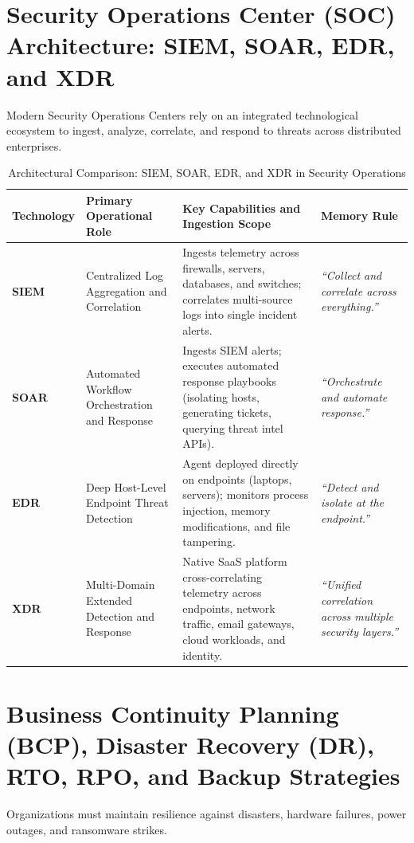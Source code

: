 \newpage
\section{Security Operations Center (SOC) Architecture: SIEM, SOAR, EDR, and XDR}

Modern Security Operations Centers rely on an integrated technological ecosystem to ingest, analyze, correlate, and respond to threats across distributed enterprises.

\begin{table}[htbp]
\centering
\caption{Architectural Comparison: SIEM, SOAR, EDR, and XDR in Security Operations}
\label{tab:siem_soar_edr_xdr}
\begin{tabularx}{\textwidth}{p{2.2cm} p{3.2cm} X X}
\toprule
\textbf{Technology} & \textbf{Primary Operational Role} & \textbf{Key Capabilities and Ingestion Scope} & \textbf{Memory Rule} \\
\midrule
\textbf{SIEM} & Centralized Log Aggregation and Correlation & Ingests telemetry across firewalls, servers, databases, and switches; correlates multi-source logs into single incident alerts. & \textit{``Collect and correlate across everything.''} \\
\textbf{SOAR} & Automated Workflow Orchestration and Response & Ingests SIEM alerts; executes automated response playbooks (isolating hosts, generating tickets, querying threat intel APIs). & \textit{``Orchestrate and automate response.''} \\
\textbf{EDR} & Deep Host-Level Endpoint Threat Detection & Agent deployed directly on endpoints (laptops, servers); monitors process injection, memory modifications, and file tampering. & \textit{``Detect and isolate at the endpoint.''} \\
\textbf{XDR} & Multi-Domain Extended Detection and Response & Native SaaS platform cross-correlating telemetry across endpoints, network traffic, email gateways, cloud workloads, and identity. & \textit{``Unified correlation across multiple security layers.''} \\
\bottomrule
\end{tabularx}
\end{table}

\newpage
\section{Business Continuity Planning (BCP), Disaster Recovery (DR), RTO, RPO, and Backup Strategies}

Organizations must maintain resilience against disasters, hardware failures, power outages, and ransomware strikes.

